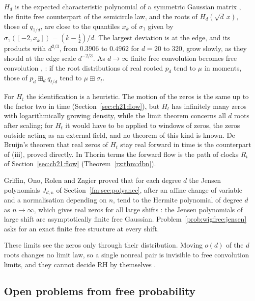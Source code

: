 $H_d$ is the expected characteristic polynomial of a symmetric Gaussian matrix \cite[Section 1.2]{MSS22}, the finite free counterpart of the semicircle law, and the roots of $H_d(\sqrt d\,x)$, those of $q_{1/d}$, are close to the quantiles $x_k$ of $\sigma_1$ given by $\sigma_1([-2,x_k])=(k-\frac12)/d$. The largest deviation is at the edge, and its products with $d^{2/3}$, from $0.3906$ to $0.4962$ for $d=20$ to $320$, grow slowly, as they should at the edge scale $d^{-2/3}$. As $d\to\infty$ finite free convolution becomes free convolution \cite{AP18}, \cite[Section 1.2]{MSS22}: if the root distributions of real rooted $p_d$ tend to $\mu$ in moments, those of $p_d\boxplus_dq_{t/d}$ tend to $\mu\boxplus\sigma_t$.

For $H_t$ the identification is a heuristic. The motion of the zeros is the same up to the factor two in time (Section~\ref{sec:ch21:flow}), but $H_t$ has infinitely many zeros with logarithmically growing density, while the limit theorem concerns all $d$ roots after scaling; for $H_t$ it would have to be applied to windows of zeros, the zeros outside acting as an external field, and no theorem of this kind is known. De Bruijn's theorem that real zeros of $H_t$ stay real forward in time \cite{deBruijn} is the counterpart of (iii), proved directly. In Thorin terms the forward flow is the path of clocks $R_t$ of Section~\ref{sec:ch21:flow} (Theorem~\ref{rz:thm:dbn}).

Griffin, Ono, Rolen and Zagier proved that for each degree $d$ the Jensen polynomials $J_{d,n}$ of Section~\ref{fm:sec:polyanec}, after an affine change of variable and a normalisation depending on $n$, tend to the Hermite polynomial of degree $d$ as $n\to\infty$, which gives real zeros for all large shifts \cite{GORZ19}: the Jensen polynomials of large shift are asymptotically finite free Gaussian. Problem~\ref{prob:wigfree:jensen} asks for an exact finite free structure at every shift.

These limits see the zeros only through their distribution. Moving $o(d)$ of the $d$ roots changes no limit law, so a single nonreal pair is invisible to free convolution limits, and they cannot decide RH by themselves \cite{P26wig}.

\subsection{Open problems from free probability}\label{sec:wigfree:open}

